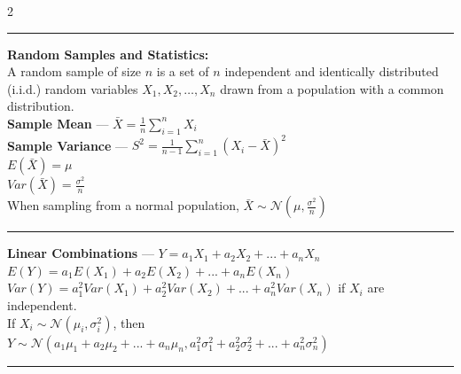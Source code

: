 \documentclass[10pt,letterpaper]{article}
\begin{document}
\begin{multicols}{2}
\vspace{0.1cm}
\hrule
\vspace{0.1cm}

\textbf{Random Samples and Statistics:}\\
A random sample of size \( n \) is a set of \( n \) independent and identically distributed (i.i.d.) random variables \( X_1, X_2, \ldots, X_n \) drawn from a population with a common distribution.\\
\textbf{Sample Mean} --- $\bar{X} = \frac{1}{n} \sum_{i=1}^n X_i$\\
\textbf{Sample Variance} --- $S^2 = \frac{1}{n-1} \sum_{i=1}^n (X_i - \bar{X})^2$\\
$E(\bar{X}) = \mu$\\
$Var(\bar{X}) = \frac{\sigma^2}{n}$\\
When sampling from a normal population, $\bar{X} \sim \mathcal{N}(\mu, \frac{\sigma^2}{n})$

\vspace{0.1cm}
\hrule
\vspace{0.1cm}

\textbf{Linear Combinations} --- $Y = a_1X_1 + a_2X_2 + ... + a_nX_n$\\
$E(Y) = a_1E(X_1) + a_2E(X_2) + ... + a_nE(X_n)$\\
$Var(Y) = a_1^2Var(X_1) + a_2^2Var(X_2) + ... + a_n^2Var(X_n)$ if \( X_i \) are independent.\\
If \( X_i \sim \mathcal{N}(\mu_i, \sigma_i^2) \), then $Y \sim \mathcal{N}(a_1\mu_1 + a_2\mu_2 + ... + a_n\mu_n, a_1^2\sigma_1^2 + a_2^2\sigma_2^2 + ... + a_n^2\sigma_n^2)$

\vspace{0.1cm}
\hrule
\vspace{0.1cm}


\end{multicols}
\end{document}
